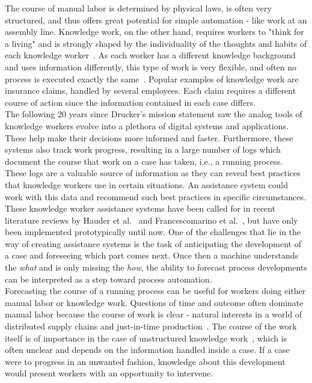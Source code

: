 The course of manual labor is determined by physical laws, is often very structured, and thus offers great potential for simple automation - like work at an assembly line. Knowledge work, on the other hand, requires workers to "think for a living" and is strongly shaped by the individuality of the thoughts and habits of each knowledge worker~\cite{drucker1999}. As each worker has a different knowledge background and uses information differently, this type of work is very flexible, and often no process is executed exactly the same~\cite{hewelt2016}. Popular examples of knowledge work are insurance claims, handled by several employees. Each claim requires a different course of action since the information contained in each case differs.\\

The following 20 years since Drucker's mission statement saw the analog tools of knowledge workers evolve into a plethora of digital systems and applications. These help make their decisions more informed and faster. Furthermore, these systems also track work progress, resulting in a large number of logs which document the course that work on a case has taken, i.e., a running process.\\

These logs are a valuable source of information as they can reveal best practices that knowledge workers use in certain situations. An assistance system could work with this data and recommend such best practices in specific circumstances. These knowledge worker assistance systems have been called for in recent literature reviews by Hauder et al.~\cite{hauder2014} and Francescomarino et al.~\cite{francescomarino2018}, but have only been implemented prototypically until now. One of the challenges that lie in the way of creating assistance systems is the task of anticipating the development of a case and foreseeing which part comes next. Once then a machine understands the \textit{what} and is only missing the \textit{how}, the ability to forecast process developments can be interpreted as a step toward process automation.\\

Forecasting the course of a running process can be useful for workers doing either manual labor or knowledge work. Questions of time and outcome often dominate manual labor because the course of work is clear - natural interests in a world of distributed supply chains and just-in-time production~\cite{web:economist:jit}. The course of the work itself is of importance in the case of unstructured knowledge work~\cite{francescomarino2015}, which is often unclear and depends on the information handled inside a case. If a case were to progress in an unwanted fashion, knowledge about this development would present workers with an opportunity to intervene.\\


